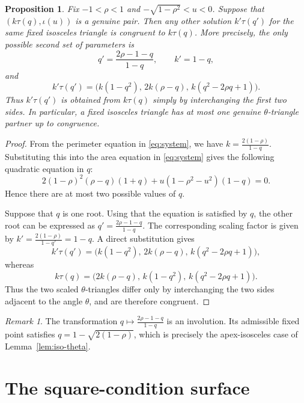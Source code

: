 \documentclass[11pt]{amsart}
\theoremstyle{plain}
\newtheorem{prop}[thm]{Proposition}
\theoremstyle{remark}
\newtheorem{rem}[thm]{Remark}
\theoremstyle{plain}
\begin{document}
\begin{prop}\label{prop:fixed-isosceles}
Fix $-1<\rho<1$ and $ -\sqrt{1-\rho^2}<u<0$. Suppose that $(k\tau(q), \iota(u))$ is a genuine pair.  Then any other solution $k'\tau(q')$ for the same fixed isosceles triangle is congruent to $k\tau(q)$. More precisely, the only possible second set of parameters is
\[
q'=\frac{2\rho-1-q}{1-q},
\qquad
k'=1-q,
\]
and
\[
k'\tau(q')
=
\bigl(
k(1-q^2),\,
2k(\rho-q),\,
k(q^2-2\rho q+1)
\bigr).
\]
Thus $k'\tau(q')$ is obtained from $k\tau(q)$ simply by interchanging the first two sides. In particular, a fixed isosceles triangle has at most one genuine $\theta$-triangle partner up to congruence.
\end{prop}

\begin{proof}
From the perimeter equation in \eqref{eq:system}, we have
$k=\frac{2(1-\rho)}{1-q}.$
Substituting this into the area equation in \eqref{eq:system} gives the following quadratic equation in $q$:
\[
2(1-\rho)^2(\rho-q)(1+q)
+u(1-\rho^2-u^2)(1-q)=0.
\] Hence there are at most two possible values of $q$.

Suppose that $q$ is one root. Using that the equation is satisfied by $q$, the other root can be expressed as
$q'=\frac{2\rho-1-q}{1-q}$.
The corresponding scaling factor is
given by $k'=\frac{2(1-\rho)}{1-q'}=1-q$.
A direct substitution gives
\[
k'\tau(q')
=
\bigl(
k(1-q^2),\,
2k(\rho-q),\,
k(q^2-2\rho q+1)
\bigr),
\]
whereas
\[
k\tau(q)
=
\bigl(
2k(\rho-q),\,
k(1-q^2),\,
k(q^2-2\rho q+1)
\bigr).
\]
Thus the two scaled $\theta$-triangles differ only by interchanging the two sides adjacent to the angle $\theta$, and are therefore congruent.
\end{proof}

\begin{rem}
The transformation
$q\longmapsto\frac{2\rho-1-q}{1-q}$
is an involution. Its admissible fixed point satisfies
$q=1-\sqrt{2(1-\rho)}$,
which is precisely the apex-isosceles case of Lemma~\ref{lem:iso-theta}.
\end{rem}

\section{The square-condition surface}
\label{sec:square-condition-surface}
\end{document}
